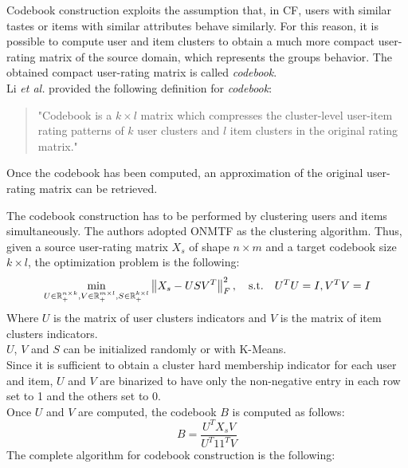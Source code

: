 Codebook construction exploits the assumption that, in CF, users with similar tastes or items with similar attributes behave similarly. For this reason, it is possible to compute user and item clusters to obtain a much more compact user-rating matrix of the source domain, which represents the groups behavior. The obtained compact user-rating matrix is called \textit{codebook}.\\
Li \textit{et al.} provided the following definition for \textit{codebook}:\\
\begin{quotation}
"Codebook is a $k \times l$ matrix which compresses the cluster-level user-item rating patterns of $k$ user clusters and $l$ item clusters in the original rating matrix."
\end{quotation}
Once the codebook has been computed, an approximation of the original user-rating matrix can be retrieved.\par
The codebook construction has to be performed by clustering users and items simultaneously. The authors adopted ONMTF \cite{10.1145/1150402.1150420} as the clustering algorithm. Thus, given a source user-rating matrix $X_s$ of shape $n \times m$ and a target codebook size $k \times l$, the optimization problem is the following:
\begin{equation}
\min_{U \in \mathbb{R}^{n \times k}_+, V \in \mathbb{R}^{m \times l}_+, S \in \mathbb{R}^{k \times l}_+} \left\lVert X_s - U S V^T\right\rVert^2_F, \quad \text{s.t.} \quad U^TU = I, V^TV = I
\end{equation}
Where $U$ is the matrix of user clusters indicators and $V$ is the matrix of item clusters indicators.\\
$U$, $V$ and $S$ can be initialized randomly or with K-Means.\\
Since it is sufficient to obtain a cluster hard membership indicator for each user and item, $U$ and $V$ are binarized to have only the non-negative entry in each row set to 1 and the others set to 0.\\
Once $U$ and $V$ are computed, the codebook $B$ is computed as follows:
\begin{equation}
\label{eq:codebook_construction}
B = \frac{U^T X_s V}{U^T 11^T V}
\end{equation}
The complete algorithm for codebook construction is the following:
\vskip 0.7cm
